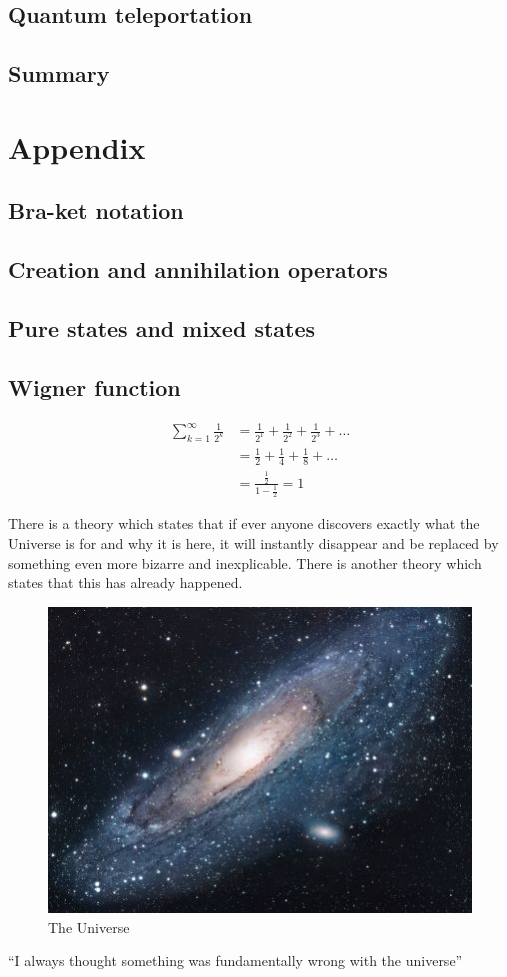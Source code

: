 \documentclass{book}
\begin{document}
\section{Quantum teleportation}
\section{Summary}

\appendix
\chapter{Appendix}
\section{Bra-ket notation}
\section{Creation and annihilation operators}
\section{Pure states and mixed states}
\section{Wigner function}

\begin{equation}
\begin{aligned}
  \sum_{k=1}^\infty \frac 1 {2^k} &= \frac 1 {2^1} + \frac 1 {2^2} + \frac 1 {2^3} + \dots \\
  &= \frac{1}{2} + \frac{1}{4} + \frac{1}{8} + \dots \\
  &= \frac{\frac 1 2}{1-\frac 1 2} =  1
\end{aligned}
\end{equation}

There is a theory which states that if ever anyone discovers exactly what the Universe is for and why it is here, it will instantly disappear and be replaced by something even more bizarre and inexplicable.
There is another theory which states that this has already happened.

\begin{figure}[h!]
\centering
\includegraphics[scale=1.7]{universe}
\caption{The Universe}
\label{fig:universe}
\end{figure}

``I always thought something was fundamentally wrong with the universe'' \citep{adams1995hitchhiker}



\end{document}
